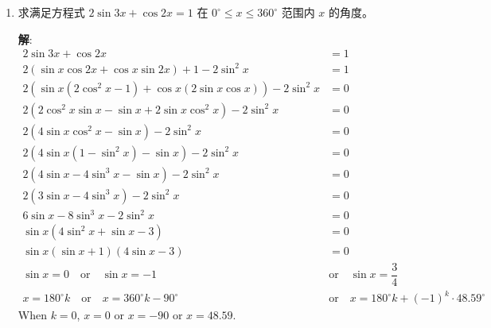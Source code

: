 \documentclass{report}
\newcommand{\sol}{\vspace{0.2cm}\textbf{解}:}
\begin{document}
\begin{enumerate}[leftmargin=*]
        \sol{}
        \begin{align*}
            3 \sin 2 x & = 2 \tan x\\
            3 \sin x \cos x &= \dfrac{\sin x}{\cos x}\\
            3 \sin x\cos^2 x - \sin x &= 0\\
            \sin x(3\cos^2 x - 1) &= 0\\
            \sin x &= 0 \quad \text{or} \quad 3\cos^2 x - 1 = 0\\
            x &= k\pi \quad \text{or} \quad \cos x = \pm \dfrac{1}{\sqrt{3}}\\
            x &= k\pi \quad \text{or} \quad x = 2k\pi \pm 0.955
        \end{align*}
        When $k = 0$, $x = 0$ or $x = \pm 0.955$.

        When $k = 1$, $x = \pi$ or $x = \pi \pm 0.955$.

        When $k = 2$, $x = 2\pi$ or $x = 2\pi \pm 0.955$.

        Since $x \leq 2\pi$, the solutions are $0, \pi, 2\pi, 0.955, \pi \pm 0.955, 2\pi - 0.955$.\hfill $\blacksquare$
        
        \item 求满足方程式 $2 \sin 3 x+\cos 2 x=1$ 在 $0^{\circ} \leq x \leq 360^{\circ}$ 范围内 $x$ 的角度。
        
        \sol{}
        \begin{align*}
            2 \sin 3 x + \cos 2 x &= 1\\
            2 (\sin x \cos 2x + \cos x \sin 2x) + 1 - 2\sin^2 x  &= 1\\
            2 (\sin x (2\cos^2 x - 1) + \cos x (2\sin x \cos x))  - 2\sin^2 x &= 0\\
            2 (2\cos^2 x \sin x - \sin x + 2\sin x \cos^2 x)  - 2\sin^2 x &= 0\\
            2(4\sin x \cos^2 x - \sin x)  - 2\sin^2x & = 0\\
            2(4\sin x (1-\sin^2 x) - \sin x)  - 2\sin^2 x & = 0\\
            2(4\sin x - 4\sin^3 x - \sin x)  - 2\sin^2 x & = 0\\
            2(3\sin x - 4\sin^3 x)  - 2\sin^2 x & = 0\\
            6\sin x - 8\sin^3 x  - 2\sin^2 x & = 0\\
            \sin x(4\sin^2 x + \sin x - 3) &= 0\\
            \sin x(\sin x + 1)(4\sin x - 3) &= 0\\
            \sin x = 0 \quad \text{or} \quad \sin x = -1 \quad &\text{or} \quad \sin x = \dfrac{3}{4}\\
            x = 180^{\circ}k \quad \text{or} \quad x = 360^{\circ}k - 90^{\circ} \quad &\text{or} \quad x = 180^{\circ}k + (-1)^k \cdot 48.59^{\circ}
        \end{align*}
        When $k = 0$, $x = 0$ or $x = -90$ or $x = 48.59$.


\end{enumerate}
\end{document}
